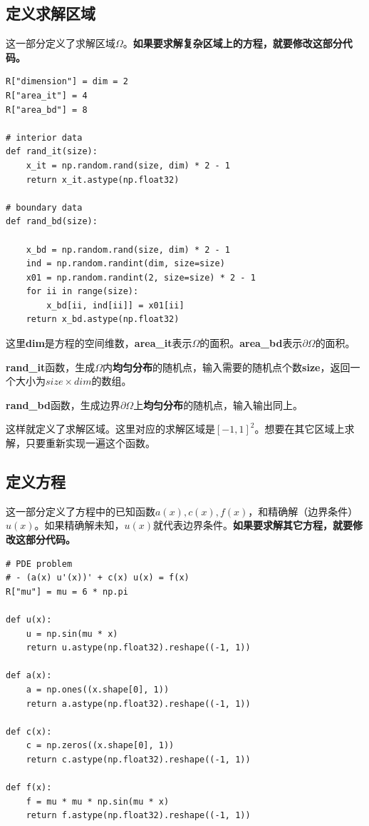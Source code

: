 \documentclass[12pt,a4paper]{article}
\begin{document}
\subsection*{定义求解区域}

这一部分定义了求解区域$\Omega$。\textbf{如果要求解复杂区域上的方程，就要修改这部分代码。}

\begin{lstlisting}
R["dimension"] = dim = 2
R["area_it"] = 4
R["area_bd"] = 8

# interior data
def rand_it(size):
    x_it = np.random.rand(size, dim) * 2 - 1
    return x_it.astype(np.float32)

# boundary data
def rand_bd(size):

    x_bd = np.random.rand(size, dim) * 2 - 1
    ind = np.random.randint(dim, size=size)
    x01 = np.random.randint(2, size=size) * 2 - 1
    for ii in range(size):
        x_bd[ii, ind[ii]] = x01[ii]
    return x_bd.astype(np.float32)
\end{lstlisting}

这里\textbf{dim}是方程的空间维数，\textbf{area\_it}表示$\Omega$的面积。\textbf{area\_bd}表示$\partial \Omega$的面积。

\textbf{rand\_it}函数，生成$\Omega$内\textbf{均匀分布}的随机点，输入需要的随机点个数\textbf{size}，返回一个大小为$size \times dim$的数组。

\textbf{rand\_bd}函数，生成边界$\partial \Omega$上\textbf{均匀分布}的随机点，输入输出同上。

这样就定义了求解区域。这里对应的求解区域是$[-1,1]^2$。想要在其它区域上求解，只要重新实现一遍这个函数。

\subsection*{定义方程}

这一部分定义了方程中的已知函数$a(x),c(x),f(x)$，和精确解（边界条件）$u(x)$。如果精确解未知，$u(x)$就代表边界条件。\textbf{如果要求解其它方程，就要修改这部分代码。}

\begin{lstlisting}
# PDE problem
# - (a(x) u'(x))' + c(x) u(x) = f(x)
R["mu"] = mu = 6 * np.pi

def u(x):
    u = np.sin(mu * x)
    return u.astype(np.float32).reshape((-1, 1))

def a(x):
    a = np.ones((x.shape[0], 1))
    return a.astype(np.float32).reshape((-1, 1))

def c(x):
    c = np.zeros((x.shape[0], 1))
    return c.astype(np.float32).reshape((-1, 1))

def f(x):
    f = mu * mu * np.sin(mu * x)
    return f.astype(np.float32).reshape((-1, 1))
\end{lstlisting}
\end{document}
